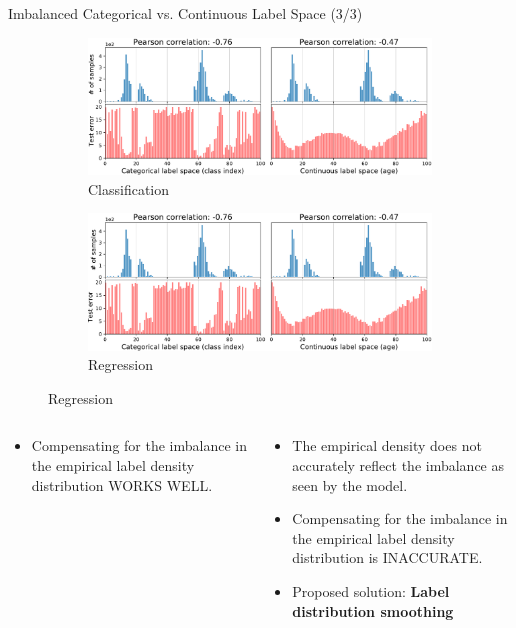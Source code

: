 \begin{frame}{Imbalanced Categorical vs. Continuous Label Space (3/3)}
	\vspace{-0.4em}
	\begin{figure}[h]
		\begin{subfigure}{0.48\textwidth}
			\includegraphics[width=\linewidth]{images/err_motivate_1_left.pdf}
			\caption{Classification}
		\end{subfigure}\hspace{1em}%
		\begin{subfigure}{0.44\textwidth}
			\includegraphics[width=\linewidth]{images/err_motivate_1_right.pdf}
			\caption{Regression}
		\end{subfigure}
	\end{figure}
	\footnotesize
	\vspace{-1em}
	\begin{columns}
		\begin{column}{0.5\textwidth}
			\begin{itemize}
				\item Compensating for the imbalance in the empirical label
				density distribution WORKS WELL.
			\end{itemize}
		\end{column}
		\begin{column}{0.5\textwidth}
			\begin{itemize}\setlength\itemsep{0em}
				\item The empirical density does not accurately reflect the imbalance as seen by the model.
				\item Compensating for the imbalance in the empirical label
				density distribution is INACCURATE.
				\item Proposed solution: \textbf{Label distribution smoothing}
			\end{itemize}
		\end{column}
	\end{columns}
\end{frame}

